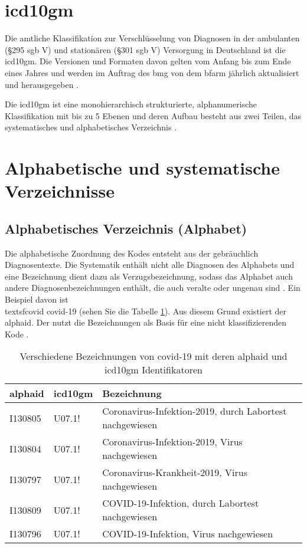 \section{\acs{icd10gm}}

Die amtliche Klassifikation zur Verschlüsselung von Diagnosen in der ambulanten (\S 295 \ac{sgb} V) und stationären (\S 301 \ac{sgb} V) Versorgung in Deutschland ist die \ac{icd10gm}. Die Versionen und Formaten davon gelten vom Anfang bis zum Ende eines Jahres und werden im Auftrag des \ac{bmg} von dem \ac{bfarm} jährlich aktualisiert und herausgegeben \cite{icd10}. 

Die \ac{icd10gm} ist eine monohierarchisch strukturierte, alphanumerische Klassifikation mit bis zu 5 Ebenen und deren Aufbau besteht aus zwei Teilen, das systematisches und alphabetisches Verzeichnis \cite{icd10}.

\section{Alphabetische und systematische Verzeichnisse}

\subsection{Alphabetisches Verzeichnis (Alphabet)} \label{alphadir}

Die alphabetische Zuordnung des Kodes entsteht aus der gebräuchlich Diagnosentexte. Die Systematik enthält nicht alle Diagnosen des Alphabets und eine Bezeichnung dient dazu als Verzugsbezeichnung, sodass das Alphabet auch andere Diagnosenbezeichnungen enthält, die auch veralte oder ungenau sind \cite{icd10alpha}. Ein Beispiel davon ist \\textsf{\acl{covid}} \acs{covid}-19 (sehen Sie die Tabelle \ref{tab:difbe}). Aus diesem Grund existiert der \ac{alphaid}. Der nutzt die Bezeichnungen als Basis für eine nicht klassifizierenden Kode \cite{icd10alpha}.

\begin{table}[ht]
	\centering
	\small
	\caption[Verschiedene Bezeichnungen von COVID-19]{Verschiedene Bezeichnungen von \ac{covid}-19 mit deren \ac{alphaid} und \ac{icd10gm} Identifikatoren}
	\label{tab:difbe}
	\begin{tabular}{|l|l|l|}
		\hline
		\rowcolor{lightgray} \ac{alphaid} & \ac{icd10gm} & Bezeichnung \\
		\hline
		I130805 & U07.1! & Coronavirus-Infektion-2019, durch Labortest nachgewiesen \\ \hline
		I130804 & U07.1! & Coronavirus-Infektion-2019, Virus nachgewiesen \\ \hline
		I130797 & U07.1! & Coronavirus-Krankheit-2019, Virus nachgewiesen \\ \hline
		I130809 & U07.1! & COVID-19-Infektion, durch Labortest nachgewiesen \\ \hline
		I130796 & U07.1! & COVID-19-Infektion, Virus nachgewiesen \\ \hline				
	\end{tabular}
\end{table}

